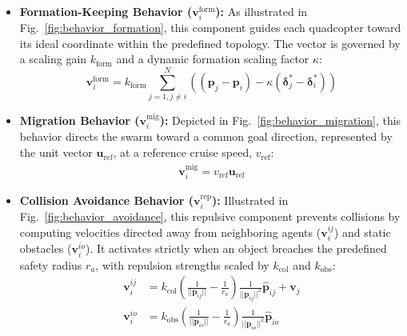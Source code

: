 \documentclass[pdflatex,sn-basic]{sn-jnl}%
\begin{document}
        \begin{itemize}
            \item \textbf{Formation-Keeping Behavior ($\boldsymbol{v}_i^{\text{form}}$):} As illustrated in Fig.~\ref{fig:behavior_formation}, this component guides each quadcopter toward its ideal coordinate within the predefined topology. The vector is governed by a scaling gain $k_{\text{form}}$ and a dynamic formation scaling factor $\kappa$:
            \begin{equation}
                \boldsymbol{v}_{i}^{\text{form}} = k_{\text{form}}\sum_{j=1,j\ne i}^{N}((\boldsymbol{p}_{j}-\boldsymbol{p}_{i})-\kappa(\boldsymbol{\delta}_{j}^{*}-\boldsymbol{\delta}_{i}^{*}))
            \end{equation}

            \item \textbf{Migration Behavior ($\boldsymbol{v}_i^{\text{mig}}$):} Depicted in Fig.~\ref{fig:behavior_migration}, this behavior directs the swarm toward a common goal direction, represented by the unit vector $\boldsymbol{u}_{\text{ref}}$, at a reference cruise speed, $v_{\text{ref}}$:
            \begin{align}
                \boldsymbol{v}_{i}^{\text{mig}} = v_{\text{ref}} \boldsymbol{u}_{\text{ref}}
            \end{align}
            
            \item \textbf{Collision Avoidance Behavior ($\boldsymbol{v}_i^{\text{rep}}$):} Illustrated in Fig.~\ref{fig:behavior_avoidance}, this repulsive component prevents collisions by computing velocities directed away from neighboring agents ($\boldsymbol{v}_{i}^{ij}$) and static obstacles ($\boldsymbol{v}_{i}^{io}$). It activates strictly when an object breaches the predefined safety radius $r_a$, with repulsion strengths scaled by $k_{\text{col}}$ and $k_{\text{obs}}$:
            \begin{align}
                \boldsymbol{v}_{i}^{ij} &= k_{\text{col}}\left(\frac{1}{||\boldsymbol{p}_{ij}||}-\frac{1}{r_{a}}\right)\frac{1}{||\boldsymbol{p}_{ij}||^{2}}\boldsymbol{\hat{p}}_{ij}+\boldsymbol{v}_{j} \\
                \boldsymbol{v}_{i}^{io} &= k_{\text{obs}}\left(\frac{1}{||\boldsymbol{p}_{io}||}-\frac{1}{r_{a}}\right)\frac{1}{||\boldsymbol{p}_{io}||^{2}}\boldsymbol{\hat{p}}_{io}
            \end{align}


\end{itemize}
\end{document}

